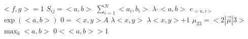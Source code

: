 \documentclass{article}
\begin{document}
$<f,g>=1$ $S_{ij}=<a,b>$ $\sum_{i=1}^{N}<a_{i},b_{i}>$ $\lambda\cdot<a,b>$ $e_{<u,i>}$ $\exp(<a,b>)$ $0=<x,y>A$
$\lambda<x,y>$ $\lambda<x,y>+1$ $\mu_{23}=<2|\vec{\mu}|3>$ $\max_{k}<a,b>$ $0<<a,b>>1$
\end{document}

